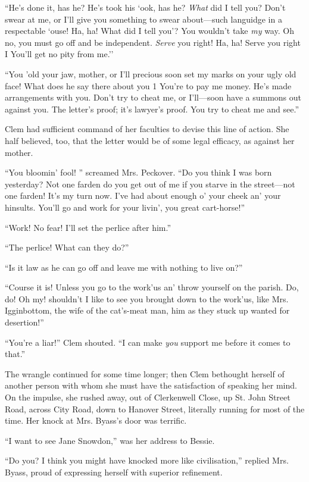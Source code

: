 ``He's done it, has he? He's took his `ook, has he? \emph{What} did I
tell you? Don't swear at me, or I'll give you something to swear
about---such languidge in a respectable `ouse! Ha, ha! What did I tell
you'? You wouldn't take \emph{my} way. Oh no, you must go off and be
independent. \emph{Serve} you right! Ha, ha! Serve you right I You'll
get no pity from me.''

``You 'old your jaw, mother, or I'll precious soon set my marks on your
ugly old face! What does he say there about you 1 You're to pay me
money. He's made arrangements with you. Don't try to cheat me, or
I'll---soon have a summons out against you. The
{\protect\hypertarget{243}{}{}}letter's proof; it's lawyer's proof. You
try to cheat me and see.''

Clem had sufficient command of her faculties to devise this line of
action. She half believed, too, that the letter would be of some legal
efficacy, as against her mother.

``You bloomin' fool! '' screamed Mrs. Peckover. ``Do you think I was
born yesterday? Not one farden do you get out of me if you starve in the
street---not one farden! It's my turn now. I've had about enough o' your
cheek an' your hinsults. You'll go and work for your livin', you great
cart-horse!''

``Work! No fear! I'll set the perlice after him.''

``The perlice! What can they do?''

``Is it law as he can go off and leave me with nothing to live on?''

``Course it is! Unless you go to the work'us an' throw yourself on the
parish. Do, do! Oh my! shouldn't I like to see you brought down to the
work'us, like Mrs. Igginbottom, the wife of the cat's-meat man, him as
they stuck up wanted for desertion!''

``You're a liar!'' Clem shouted. ``I can make \emph{you} support me
before it comes to that.''

{\protect\hypertarget{244}{}{}}The wrangle continued for some time
longer; then Clem bethought herself of another person with whom she must
have the satisfaction of speaking her mind. On the impulse, she rushed
away, out of Clerkenwell Close, up St. John Street Road, across City
Road, down to Hanover Street, literally running for most of the time.
Her knock at Mrs. Byass's door was terrific.

``I want to see Jane Snowdon,'' was her address to Bessie.

``Do you? I think you might have knocked more like civilisation,''
replied Mrs. Byass, proud of expressing herself with superior
refinement.

